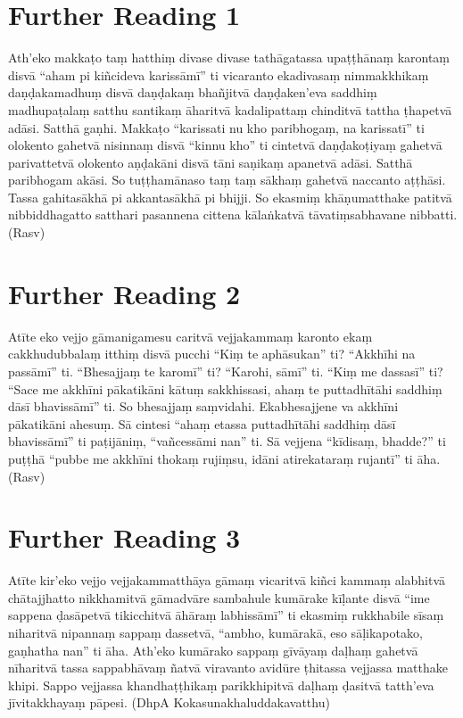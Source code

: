 \section*{Further Reading 1}

Ath’eko makkaṭo taṃ hatthiṃ divase divase tathāgatassa upaṭṭhānaṃ karontaṃ disvā “aham pi kiñcideva karissāmī” ti vicaranto ekadivasaṃ nimmakkhikaṃ daṇḍakamadhuṃ disvā daṇḍakaṃ bhañjitvā daṇḍaken’eva saddhiṃ madhupaṭalaṃ satthu santikaṃ āharitvā kadalipattaṃ chinditvā tattha ṭhapetvā adāsi. Satthā gaṇhi. Makkaṭo “karissati nu kho paribhogaṃ, na karissatī” ti olokento gahetvā nisinnaṃ disvā “kinnu kho” ti cintetvā daṇḍakoṭiyaṃ gahetvā parivattetvā olokento aṇḍakāni disvā tāni saṇikaṃ apanetvā adāsi. Satthā paribhogam akāsi. So tuṭṭhamānaso taṃ taṃ sākhaṃ gahetvā naccanto aṭṭhāsi. Tassa gahitasākhā pi akkantasākhā pi bhijji. So ekasmiṃ khāṇumatthake patitvā nibbiddhagatto satthari pasannena cittena kālaṅkatvā tāvatiṃsabhavane nibbatti. (Rasv)

\section*{Further Reading 2}

Atīte eko vejjo gāmanigamesu caritvā vejjakammaṃ karonto ekaṃ cakkhudubbalaṃ itthiṃ disvā pucchi “Kiṃ te aphāsukan” ti? “Akkhīhi na passāmī” ti. “Bhesajjaṃ te karomī” ti? “Karohi, sāmī” ti. “Kiṃ me dassasī” ti? “Sace me akkhīni pākatikāni kātuṃ sakkhissasi, ahaṃ te puttadhītāhi saddhiṃ dāsī bhavissāmī” ti. So bhesajjaṃ saṃvidahi. Ekabhesajjene va akkhīni pākatikāni ahesuṃ. Sā cintesi “ahaṃ etassa puttadhītāhi saddhiṃ dāsī bhavissāmī” ti paṭijāniṃ, “vañcessāmi nan” ti. Sā vejjena “kīdisaṃ, bhadde?” ti puṭṭhā “pubbe me akkhīni thokaṃ rujiṃsu, idāni atirekataraṃ rujantī” ti āha. (Rasv)

\section*{Further Reading 3}

Atīte kir’eko vejjo vejjakammatthāya gāmaṃ vicaritvā kiñci kammaṃ alabhitvā chātajjhatto nikkhamitvā gāmadvāre sambahule kumārake kīḷante disvā “ime sappena ḍasāpetvā tikicchitvā āhāraṃ labhissāmī” ti ekasmiṃ rukkhabile sīsaṃ niharitvā nipannaṃ sappaṃ dassetvā, “ambho, kumārakā, eso sāḷikapotako, gaṇhatha nan” ti āha. Ath’eko kumārako sappaṃ gīvāyaṃ daḷhaṃ gahetvā nīharitvā tassa sappabhāvaṃ ñatvā viravanto avidūre ṭhitassa vejjassa matthake khipi. Sappo vejjassa khandhaṭṭhikaṃ parikkhipitvā daḷhaṃ ḍasitvā tatth’eva jīvitakkhayaṃ pāpesi. (DhpA Kokasunakhaluddakavatthu)

